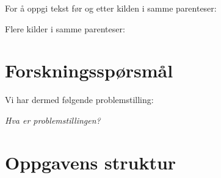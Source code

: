 For å oppgi tekst før og etter kilden i samme parenteser: \citep[for eksempel][side 3]{paraschiv_bankruptcy_2021}

Flere kilder i samme parenteser: \citep{paraschiv_bankruptcy_2021,kamal_cryptocurrencies_2023} 





\section{Forskningsspørsmål}\label{sec:forskningsspm}
Vi har dermed følgende problemstilling:

\begin{center}
\textit{Hva er problemstillingen?}
\end{center}


\section{Oppgavens struktur}